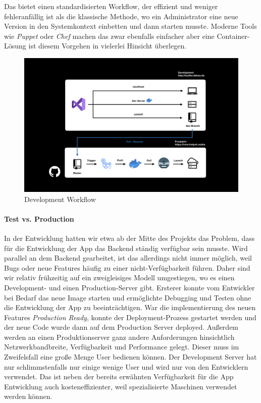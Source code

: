 \documentclass[titlepage, a4paper, 11pt]{scrartcl}
\begin{document}
          Das bietet einen standardisierten Workflow, der effizient und weniger fehleranfällig ist als die klassische Methode, wo ein Administrator eine neue Version in den Systemkontext einbetten und
          dann starten musste. Moderne Tools wie \textit{Puppet} oder \textit{Chef} machen das zwar ebenfalls einfacher aber eine Container-Lösung ist diesem Vorgehen in vielerlei Hinsicht überlegen.

          \begin{figure}[H]
            \centering
            \includegraphics[width=.8\textwidth]{pipeline.png}
            \caption{Development Workflow}
            \label{pipeline}
          \end{figure}

        \paragraph{Test vs. Production}

          In der Entwicklung hatten wir etwa ab der Mitte des Projekts das Problem, dass für die Entwicklung der App das Backend ständig verfügbar sein musste.
          Wird parallel an dem Backend gearbeitet, ist das allerdings nicht immer möglich, weil Bugs oder neue Features häufig zu einer nicht-Verfügbarkeit führen.
          Daher sind wir relativ frühzeitig auf ein zweigleisiges Modell umgestiegen, wo es einen Development- und einen Production-Server gibt. 
          Ersterer konnte vom Entwickler bei Bedarf das neue Image starten und ermöglichte Debugging und Testen ohne die Entwicklung der App zu beeinträchtigen.
          War die implementierung des neuen Features \textit{Production Ready}, konnte der Deployment-Prozess gestartet werden und der neue Code wurde dann auf dem Production
          Server deployed. Außerdem werden an einen Produktionserver ganz andere Anforderungen hinsichtlich Netzwerkbandbreite, Verfügbarkeit und Performance gelegt.
          Dieser muss im Zweifelsfall eine große Menge User bedienen können. Der Development Server hat nur schlimmstenfalls nur einige wenige User und wird nur von den Entwicklern verwendet.
          Das ist neben der bereits erwähnten Verfügbarkeit für die App Entwicklung auch kosteneffizienter, weil spezialisierte Maschinen verwendet werden können.
\end{document}
